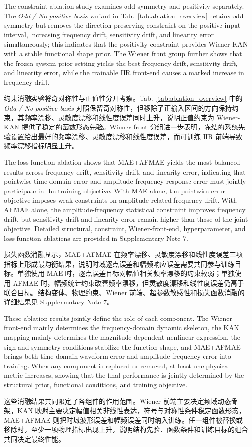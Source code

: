 \documentclass[sn-nature]{sn-jnl}
\newif\ifCNENEnglish
\newif\ifCNENBilingual
\newcommand{\CNEN}[2]{%
    \ifCNENBilingual
        #1%
        \if\relax\detokenize{#2}\relax\else\par #2\fi%
    \else
        \ifCNENEnglish
            #2%
        \else
            #1%
        \fi
    \fi
}
\begin{document}
\CNEN{约束消融实验将奇对称性与正值性分开考察。Tab.~\ref{tab:ablation_overview} 中的 \textit{Odd / No positive basis} 对照保留奇对称性，但移除了正输入区间的方向保持约束，其频率漂移、灵敏度漂移和线性度误差同时上升，说明正值约束为 Wiener-KAN 提供了稳定的函数形态先验。Wiener front 分组进一步表明，冻结的系统先验设置给出最好的频率漂移、灵敏度漂移和线性度误差，而可训练 IIR 前端导致频率漂移指标明显上升。}{The constraint ablation study examines odd symmetry and positivity separately. The \textit{Odd / No positive basis} variant in Tab.~\ref{tab:ablation_overview} retains odd symmetry but removes the direction-preserving constraint on the positive input interval, increasing frequency drift, sensitivity drift, and linearity error simultaneously; this indicates that the positivity constraint provides Wiener-KAN with a stable functional shape prior. The Wiener front group further shows that the frozen system prior setting yields the best frequency drift, sensitivity drift, and linearity error, while the trainable IIR front-end causes a marked increase in frequency drift.%
}

\CNEN{损失函数消融显示，MAE+AFMAE 在频率漂移、灵敏度漂移和线性度误差三项指标上形成最均衡结果，说明时域逐点误差和幅频响应误差需要共同参与训练目标。单独使用 MAE 时，逐点误差目标对幅值相关频率漂移的约束较弱；单独使用 AFMAE 时，幅频统计约束改善频率漂移，但灵敏度漂移和线性度误差仍高于联合目标。结构变体、物理约束、Wiener 前端、超参数敏感性和损失函数消融的详细结果见 Supplementary Note 7。}{The loss-function ablation shows that MAE+AFMAE yields the most balanced results across frequency drift, sensitivity drift, and linearity error, indicating that pointwise time-domain error and amplitude-frequency response error must jointly participate in the training objective. With MAE alone, the pointwise error objective imposes weak constraints on amplitude-related frequency drift. With AFMAE alone, the amplitude-frequency statistical constraint improves frequency drift, but sensitivity drift and linearity error remain higher than those of the joint objective. Detailed structural, constraint, Wiener-front-end, hyperparameter, and loss-function ablations are provided in Supplementary Note 7.%
}

\CNEN{这些消融结果共同限定了各组件的作用范围。Wiener 前端主要决定频域动态骨架，KAN 映射主要决定幅值相关非线性表达，符号与对称性条件稳定函数形态，MAE+AFMAE 则把时域波形误差和幅频误差同时纳入训练。任一组件被替换或移除时，至少一项物理指标出现上升，说明结构先验、函数条件和训练目标的组合共同决定最终性能。}{These ablation results jointly define the role of each component. The Wiener front-end mainly determines the frequency-domain dynamic skeleton, the KAN mapping mainly determines the magnitude-dependent nonlinear expression, the sign and symmetry conditions stabilize the function shape, and MAE+AFMAE brings both time-domain waveform error and amplitude-frequency error into training. When any component is replaced or removed, at least one physical metric increases, showing that the final performance is jointly determined by the structural prior, functional conditions, and training objective.}
\end{document}
